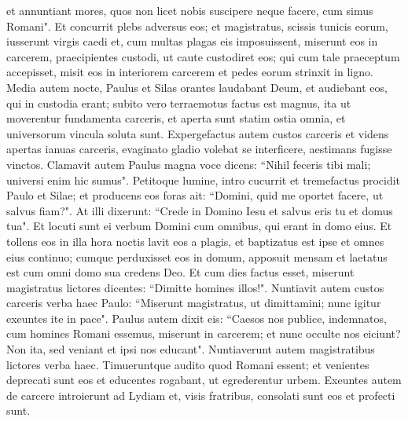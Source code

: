 \begin{biblechapter}
\verse et annuntiant mores, quos non licet nobis suscipere neque facere, cum simus Romani". 
\verse Et concurrit plebs adversus eos; et magistratus, scissis tunicis eorum, iusserunt virgis caedi 
\verse et, cum multas plagas eis imposuissent, miserunt eos in carcerem, praecipientes custodi, ut caute custodiret eos; 
\verse qui cum tale praeceptum accepisset, misit eos in interiorem carcerem et pedes eorum strinxit in ligno. 
\verse Media autem nocte, Paulus et Silas orantes laudabant Deum, et audiebant eos, qui in custodia erant; 
\verse subito vero terraemotus factus est magnus, ita ut moverentur fundamenta carceris, et aperta sunt statim ostia omnia, et universorum vincula soluta sunt. 
\verse Expergefactus autem custos carceris et videns apertas ianuas carceris, evaginato gladio volebat se interficere, aestimans fugisse vinctos. 
\verse Clamavit autem Paulus magna voce dicens: “Nihil feceris tibi mali; universi enim hic sumus". 
\verse Petitoque lumine, intro cucurrit et tremefactus procidit Paulo et Silae; 
\verse et producens eos foras ait: “Domini, quid me oportet facere, ut salvus fiam?". 
\verse At illi dixerunt: “Crede in Domino Iesu et salvus eris tu et domus tua". 
\verse Et locuti sunt ei verbum Domini cum omnibus, qui erant in domo eius. 
\verse Et tollens eos in illa hora noctis lavit eos a plagis, et baptizatus est ipse et omnes eius continuo; 
\verse cumque perduxisset eos in domum, apposuit mensam et laetatus est cum omni domo sua credens Deo. 
\verse Et cum dies factus esset, miserunt magistratus lictores dicentes: “Dimitte homines illos!". 
\verse Nuntiavit autem custos carceris verba haec Paulo: “Miserunt magistratus, ut dimittamini; nunc igitur exeuntes ite in pace". 
\verse Paulus autem dixit eis: “Caesos nos publice, indemnatos, cum homines Romani essemus, miserunt in carcerem; et nunc occulte nos eiciunt? Non ita, sed veniant et ipsi nos educant". 
\verse Nuntiaverunt autem magistratibus lictores verba haec. Timueruntque audito quod Romani essent; 
\verse et venientes deprecati sunt eos et educentes rogabant, ut egrederentur urbem. 
\verse Exeuntes autem de carcere introierunt ad Lydiam et, visis fratribus, consolati sunt eos et profecti sunt. 
\end{biblechapter}

